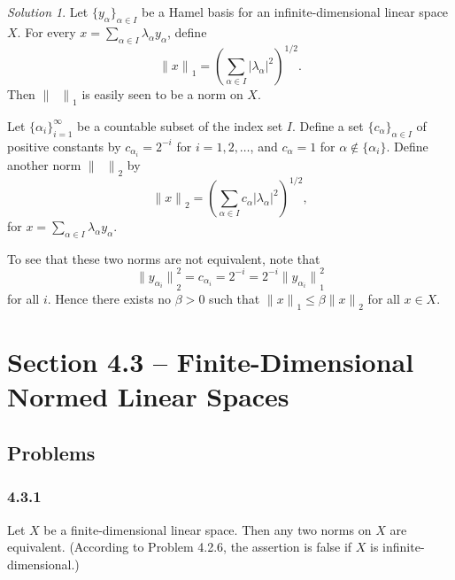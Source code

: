 \documentclass{report}
\newcommand{\norm}[1]{{\lVert #1 \rVert}}
\theoremstyle{remark}
\newtheorem*{solution}{Solution}
\begin{document}
\begin{solution}
  Let $\{y_\alpha\}_{\alpha \in I}$ be a Hamel basis for an infinite-dimensional linear space $X$. For every $x = \sum_{\alpha \in I} \lambda_\alpha y_\alpha$, define
  \begin{equation*}
    \norm{x}_1 = \left( \sum_{\alpha \in I} |\lambda_\alpha|^2 \right)^{1/2}.
  \end{equation*}
  Then $\norm{\phantom x}_1$ is easily seen to be a norm on $X$.

  Let $\{\alpha_i\}_{i=1}^\infty$ be a countable subset of the index set $I$. Define a set $\{c_\alpha\}_{\alpha \in I}$ of positive constants by $c_{\alpha_i} = 2^{-i}$ for $i = 1,2,\dots$, and $c_{\alpha} = 1$ for $\alpha \notin \{\alpha_i\}$. Define another norm $\norm{\phantom x}_2$ by
  \begin{equation*}
    \norm{x}_2 = \left( \sum_{\alpha \in I} c_\alpha |\lambda_\alpha|^2 \right)^{1/2},
  \end{equation*}
  for $x = \sum_{\alpha \in I} \lambda_\alpha y_\alpha$.

  To see that these two norms are not equivalent, note that
  \begin{equation*}
    \norm{y_{\alpha_i}}_2^2 = c_{\alpha_i} = 2^{-i} = 2^{-i} \norm{y_{\alpha_i}}_1^2
  \end{equation*}
  for all $i$. Hence there exists no $\beta > 0$ such that $\norm{x}_1 \le \beta \norm{x}_2$ for all $x \in X$.
\end{solution}

\section*{Section 4.3 -- Finite-Dimensional Normed Linear Spaces}

\subsection*{Problems}

\subsubsection*{4.3.1}
Let $X$ be a finite-dimensional linear space. Then any two norms on $X$ are equivalent. (According to Problem 4.2.6, the assertion is false if $X$ is infinite-dimensional.)
\end{document}
